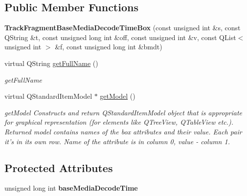 \subsection*{Public Member Functions}
\begin{DoxyCompactItemize}
\item 
\hypertarget{class_track_fragment_base_media_decode_time_box_a151a6498d18968fe5e9f7c78c5f1465f}{{\bfseries Track\-Fragment\-Base\-Media\-Decode\-Time\-Box} (const unsigned int \&s, const Q\-String \&t, const unsigned long int \&off, const unsigned int \&v, const Q\-List$<$ unsigned int $>$ \&f, const unsigned long int \&bmdt)}\label{class_track_fragment_base_media_decode_time_box_a151a6498d18968fe5e9f7c78c5f1465f}

\item 
virtual Q\-String \hyperlink{class_track_fragment_base_media_decode_time_box_acf81a553080878b3066b24fc00b14f9e}{get\-Full\-Name} ()
\begin{DoxyCompactList}\small\item\em get\-Full\-Name \end{DoxyCompactList}\item 
virtual Q\-Standard\-Item\-Model $\ast$ \hyperlink{class_track_fragment_base_media_decode_time_box_a6a0cf2982f9e9a8a8ba5adf6c18d6caf}{get\-Model} ()
\begin{DoxyCompactList}\small\item\em get\-Model Constructs and return Q\-Standard\-Item\-Model object that is appropriate for graphical representation (for elements like Q\-Tree\-View, Q\-Table\-View etc.). Returned model contains names of the box attributes and their value. Each pair it's in its own row. Name of the attribute is in column 0, value -\/ column 1. \end{DoxyCompactList}\end{DoxyCompactItemize}
\subsection*{Protected Attributes}
\begin{DoxyCompactItemize}
\item 
\hypertarget{class_track_fragment_base_media_decode_time_box_af0f903b58c6feb4d3972611d9bee1c9f}{unsigned long int {\bfseries base\-Media\-Decode\-Time}}\label{class_track_fragment_base_media_decode_time_box_af0f903b58c6feb4d3972611d9bee1c9f}

\end{DoxyCompactItemize}


